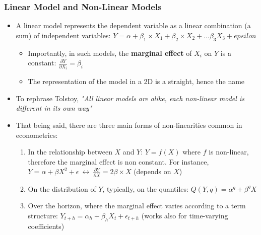 \documentclass{beamer}
\begin{document}
\begin{frame}
  \frametitle{Linear Model and Non-Linear Models}

  \begin{itemize}
  \item A linear model represents the dependent variable as a linear combination (a sum) of independent variables: $Y = \alpha + \beta_1 \times X_1 + \beta_2 \times X_2 + \dots \beta_3 X_3 + epsilon$
    \begin{itemize}
    \item Importantly, in such models, the \textbf{marginal effect} of $X_i$ on $Y$ is a constant: $\frac{\partial Y}{\partial X_i} = \beta_i$
    \item The representation of the model in a 2D is a straight, hence the name
    \end{itemize}
  \item To rephrase Tolstoy, \emph{"All linear models are alike, each non-linear model is different in its own way"}
  \item That being said, there are three main forms of non-linearities common in econometrics:
    \begin{enumerate}
    \item In the relationship between $X$ and $Y$: $Y = f(X)$ where $f$ is non-linear, therefore the marginal effect is non constant. For instance, $Y = \alpha + \beta X^2 + \epsilon \ \leftrightarrow \ \frac{\partial Y}{\partial X} = 2 \beta \times X$ (depends on $X$)
    \item On the distribution of $Y$, typically, on the quantiles: $Q(Y, q) = \alpha^q + \beta^q X$
    \item Over the horizon, where the marginal effect varies according to a term structure: $Y_{t+h} = \alpha_h + \beta_h X_t + \epsilon_{t+h}$ (works also for time-varying coefficients)
    \end{enumerate}
  \end{itemize}
  
\end{frame}
\end{document}
